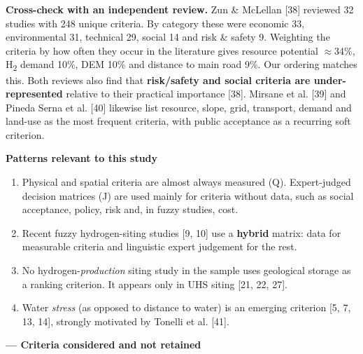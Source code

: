 \documentclass[11pt,a4paper]{article}
\begin{document}
\textbf{Cross-check with an independent review.} Zun \& McLellan [38] reviewed 32 studies with 248 unique criteria. By category these were economic 33, environmental 31, technical 29, social 14 and risk \& safety 9. Weighting the criteria by how often they occur in the literature gives resource potential $\approx$34\%, H\textsubscript{2} demand 10\%, DEM 10\% and distance to main road 9\%. Our ordering matches this. Both reviews also find that \textbf{risk/safety and social criteria are under-represented} relative to their practical importance [38]. Mirsane et al. [39] and Pineda Serna et al. [40] likewise list resource, slope, grid, transport, demand and land-use as the most frequent criteria, with public acceptance as a recurring soft criterion.

\textbf{Patterns relevant to this study}

\begin{enumerate}\setlength\itemsep{1pt}

  \item Physical and spatial criteria are almost always measured (Q). Expert-judged decision matrices (J) are used mainly for criteria without data, such as social acceptance, policy, risk and, in fuzzy studies, cost.

  \item Recent fuzzy hydrogen-siting studies [9, 10] use a \textbf{hybrid} matrix: data for measurable criteria and linguistic expert judgement for the rest.

  \item No hydrogen-\textit{production} siting study in the sample uses geological storage as a ranking criterion. It appears only in UHS siting [21, 22, 27].

  \item Water \textit{stress} (as opposed to distance to water) is an emerging criterion [5, 7, 13, 14], strongly motivated by Tonelli et al. [41].

\end{enumerate}

\textbf{--- Criteria considered and not retained}
\end{document}
